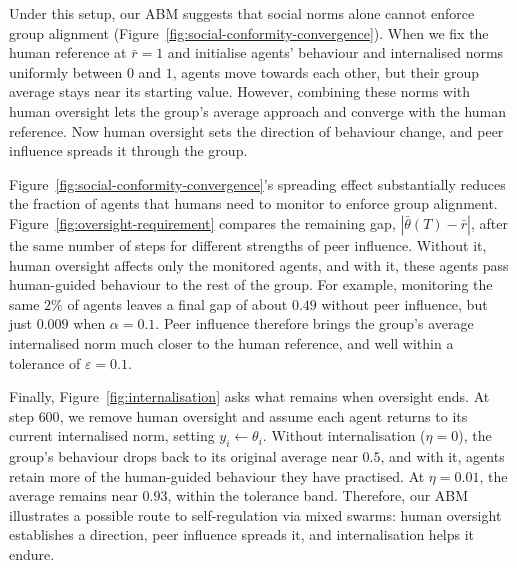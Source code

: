 Under this setup, our ABM suggests that social norms alone cannot enforce group alignment (Figure~\ref{fig:social-conformity-convergence}). When we fix the human reference at $\bar r=1$ and initialise agents' behaviour and internalised norms uniformly between $0$ and $1$, agents move towards each other, but their group average stays near its starting value. However, combining these norms with human oversight lets the group's average approach and converge with the human reference. Now human oversight sets the direction of behaviour change, and peer influence spreads it through the group. 



Figure~\ref{fig:social-conformity-convergence}'s spreading effect substantially reduces the fraction of agents that humans need to monitor to enforce group alignment. Figure~\ref{fig:oversight-requirement} compares the remaining gap, $|\bar\theta(T)-\bar r|$, after the same number of steps for different strengths of peer influence. Without it, human oversight affects only the monitored agents, and with it, these agents pass human-guided behaviour to the rest of the group. For example, monitoring the same $2\%$ of agents leaves a final gap of about $0.49$ without peer influence, but just $0.009$ when $\alpha=0.1$. Peer influence therefore brings the group's average internalised norm much closer to the human reference, and well within a tolerance of $\varepsilon=0.1$.



Finally, Figure~\ref{fig:internalisation} asks what remains when oversight ends. At step $600$, we remove human oversight and assume each agent returns to its current internalised norm, setting $y_i\leftarrow\theta_i$. Without internalisation ($\eta=0$), the group's behaviour drops back to its original average near $0.5$, and with it, agents retain more of the human-guided behaviour they have practised. At $\eta=0.01$, the average remains near $0.93$, within the tolerance band. Therefore, our ABM illustrates a possible route to self-regulation via mixed swarms: human oversight establishes a direction, peer influence spreads it, and internalisation helps it endure.


